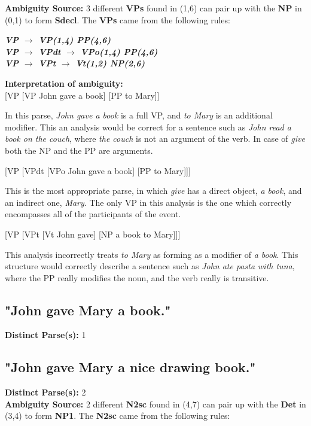 \documentclass{article}
\begin{document}
\textbf{Ambiguity Source:} 3 different \textbf{VPs} found in (1,6) can pair up with the \textbf{NP} in (0,1) to form \textbf{Sdecl}. The \textbf{VPs} came from the following rules:

\begin{center}
	\textbf{\emph{VP $\rightarrow$ VP(1,4) PP(4,6)}\\
	\emph{VP $\rightarrow$ VPdt $\rightarrow$ VPo(1,4) PP(4,6)}\\
	\emph{VP $\rightarrow$ VPt $\rightarrow$ Vt(1,2) NP(2,6)}}
\end{center}

\textbf{Interpretation of ambiguity:}\\
{[}VP {[}VP John gave a book{]} {[}PP to Mary{]}{]}

In this parse, \emph{John gave a book} is a full VP, and \emph{to Mary} is an additional modifier. This an analysis would be correct for a sentence such as \emph{John read a book on the couch}, where \emph{the couch} is not an argument of the verb. In case of \emph{give} both the NP and the PP are arguments.

[VP [VPdt [VPo John gave a book] [PP to Mary]]]

This is the most appropriate parse, in which \emph{give} has a direct object, \emph{a book}, and an indirect one, \emph{Mary}. The only VP in this analysis is the one which correctly encompasses all of the participants of the event.

[VP [VPt [Vt John gave] [NP a book to Mary]]]

This analysis incorrectly treats \emph{to Mary} as forming as a modifier of \emph{a book}. This structure would correctly describe a sentence such as \emph{John ate pasta with tuna}, where the PP really modifies the noun, and the verb really is transitive.

\subsection{"John gave Mary a book."}

\textbf{Distinct Parse(s):} 1

\subsection{"John gave Mary a nice drawing book."}

\textbf{Distinct Parse(s):} 2\\

\textbf{Ambiguity Source:} 2 different \textbf{N2sc} found in (4,7) can pair up with the \textbf{Det} in (3,4) to form \textbf{NP1}. The \textbf{N2sc} came from the following rules:
\end{document}
